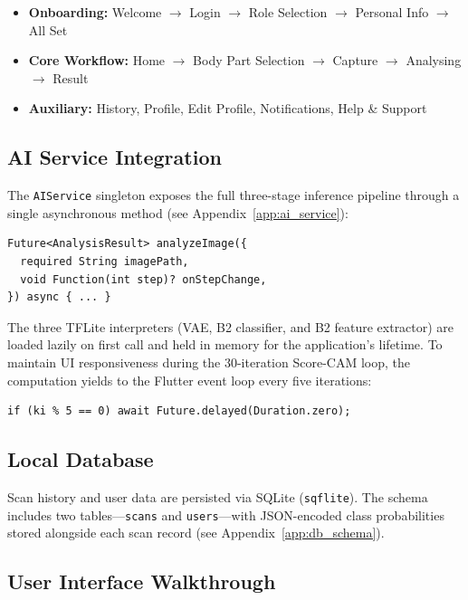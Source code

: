 \begin{itemize}
    \item \textbf{Onboarding:} Welcome $\rightarrow$ Login $\rightarrow$ Role Selection $\rightarrow$ Personal Info $\rightarrow$ All Set
    \item \textbf{Core Workflow:} Home $\rightarrow$ Body Part Selection $\rightarrow$ Capture $\rightarrow$ Analysing $\rightarrow$ Result
    \item \textbf{Auxiliary:} History, Profile, Edit Profile, Notifications, Help \& Support
\end{itemize}

\subsection{AI Service Integration}

The \texttt{AIService} singleton exposes the full three-stage inference pipeline through a single asynchronous method (see Appendix~\ref{app:ai_service}):

\begin{verbatim}
Future<AnalysisResult> analyzeImage({
  required String imagePath,
  void Function(int step)? onStepChange,
}) async { ... }
\end{verbatim}

The three TFLite interpreters (VAE, B2 classifier, and B2 feature extractor) are loaded lazily on first call and held in memory for the application's lifetime. To maintain UI responsiveness during the 30-iteration Score-CAM loop, the computation yields to the Flutter event loop every five iterations:

\begin{verbatim}
if (ki % 5 == 0) await Future.delayed(Duration.zero);
\end{verbatim}

\subsection{Local Database}

Scan history and user data are persisted via SQLite (\texttt{sqflite}). The schema includes two tables---\texttt{scans} and \texttt{users}---with JSON-encoded class probabilities stored alongside each scan record (see Appendix~\ref{app:db_schema}).

\subsection{User Interface Walkthrough}

